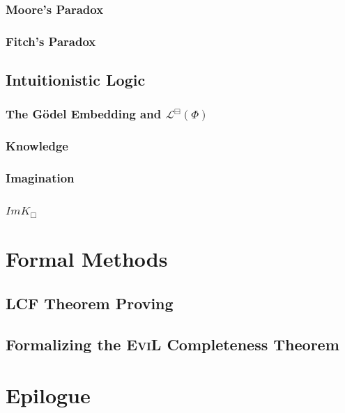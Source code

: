 \documentclass[11pt]{article}
\numberwithin{equation}{subsection}
\newcommand{\BB}{\boxminus}
\begin{document}
\subsubsection{Moore's Paradox}
\subsubsection{Fitch's Paradox}
\subsection{Intuitionistic Logic}
\subsubsection{The G\"{o}del Embedding and $\mathcal{L}^\BB(\Phi)$}
\subsubsection{Knowledge}
\subsubsection{Imagination}
\subsubsection{$ImK_\Box$}

\section{Formal Methods}\label{formal}

\subsection{LCF Theorem Proving}
\subsection{Formalizing the \textsc{EviL} Completeness Theorem}

\section{Epilogue}
\end{document}
